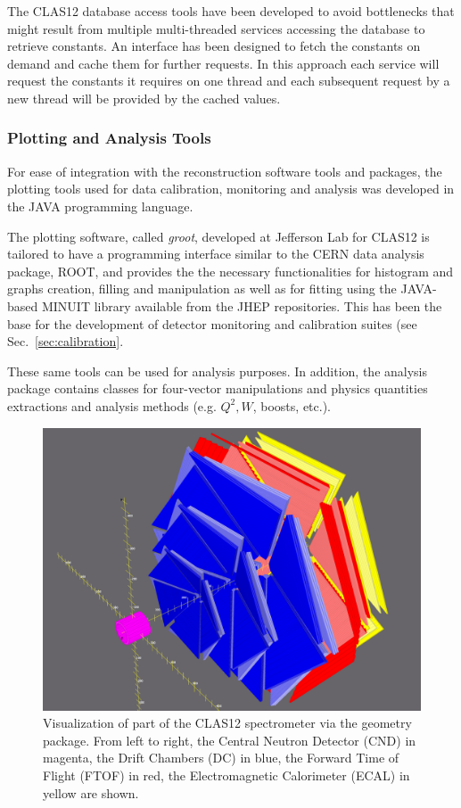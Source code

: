 The CLAS12 database access tools have been developed to avoid bottlenecks that might result from multiple multi-threaded
services accessing the database to retrieve constants.  An interface has been designed to fetch the constants
on demand and cache them for further requests. In this approach each service will request the
constants it requires on one thread and each subsequent request by a new thread will be provided by the cached values.

\subsubsection{Plotting and Analysis Tools}

For ease of integration with the reconstruction software tools and packages, the plotting tools used for data
calibration, monitoring and analysis was developed in the JAVA programming language.

The plotting software, called {\it groot}, developed at Jefferson Lab for CLAS12 is tailored to have a programming
interface similar to the CERN data analysis package, ROOT, and provides the the necessary functionalities for histogram and graphs creation, filling and manipulation as well as for fitting using the JAVA-based MINUIT library available from the JHEP repositories. This has been the base for the development of detector monitoring and calibration suites (see Sec.~\ref{sec:calibration}.

These same tools can be used for analysis purposes. In addition, the analysis package contains classes for four-vector manipulations and physics quantities extractions and
analysis methods (e.g. $Q^2, W$, boosts, etc.).

\begin{figure}
\centering
\includegraphics[width=1.0\columnwidth]{reconstruction/pics/detectorview.png}
\caption{Visualization of part of the CLAS12 spectrometer via the geometry package. From left to right, the Central Neutron Detector (CND) in magenta, the Drift Chambers (DC) in blue, the Forward Time of Flight (FTOF) in red, the Electromagnetic Calorimeter (ECAL) in yellow are shown.}
\label{fig:detectorview}
\end{figure}
